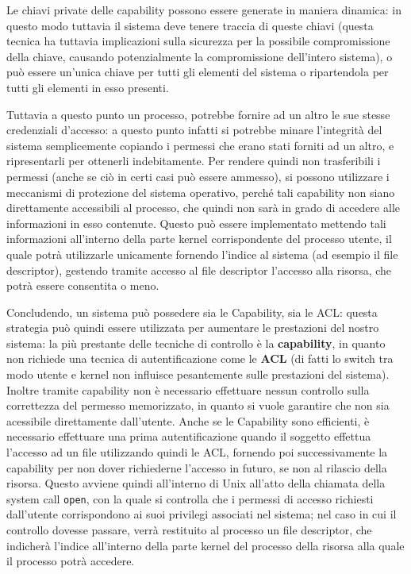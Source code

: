 Le chiavi private delle capability possono essere generate in maniera dinamica:
in questo modo tuttavia il sistema 
deve tenere traccia di queste chiavi (questa tecnica ha tuttavia implicazioni sulla sicurezza
per la possibile compromissione della chiave, causando potenzialmente la compromissione
dell'intero sistema), o può essere un'unica chiave per tutti gli elementi
del sistema o ripartendola per tutti gli elementi in esso presenti.

Tuttavia a questo punto un processo, potrebbe fornire ad un altro le sue stesse 
credenziali d'accesso: a questo punto infatti si potrebbe minare l'integrità
del sistema semplicemente copiando i permessi che erano stati forniti ad un 
altro, e ripresentarli per ottenerli indebitamente. Per rendere quindi non 
trasferibili i permessi (anche se ciò in certi casi può essere ammesso), si possono
utilizzare i meccanismi di protezione del sistema operativo, perché tali capability
non siano direttamente accessibili al processo, che quindi non sarà in grado di 
accedere alle informazioni in esso contenute. Questo può essere implementato
mettendo tali informazioni all'interno della parte kernel corrispondente del 
processo utente, il quale potrà utilizzarle unicamente fornendo l'indice al 
sistema (ad esempio il file descriptor), gestendo tramite accesso al file
descriptor l'accesso alla risorsa, che potrà essere consentita o meno.


Concludendo, un sistema può possedere sia le Capability, sia le ACL: questa
strategia può quindi essere utilizzata per aumentare le prestazioni del nostro
sistema: la più prestante delle tecniche di controllo è la \textbf{capability}, in
quanto non richiede una tecnica di autentificazione come le \textbf{ACL} (di fatti
lo switch tra modo utente e kernel non influisce pesantemente sulle prestazioni
del sistema). Inoltre tramite capability non è necessario effettuare nessun 
controllo sulla correttezza del permesso memorizzato, in quanto si vuole 
garantire che non sia acessibile direttamente dall'utente. Anche se le Capability
sono efficienti, è necessario effettuare una prima autentificazione quando il
soggetto effettua l'accesso ad un file utilizzando quindi le ACL, fornendo
poi successivamente la capability per non dover richiederne l'accesso in futuro,
se non al rilascio della risorsa. Questo avviene quindi all'interno di Unix
all'atto della chiamata della system call \texttt{open}, con la quale si controlla
che i permessi di accesso richiesti dall'utente corrispondono ai suoi privilegi
associati nel sistema; nel caso in cui il controllo dovesse passare, verrà 
restituito al processo un file descriptor, che indicherà l'indice all'interno
della parte kernel del processo della risorsa alla quale il processo potrà
accedere.

